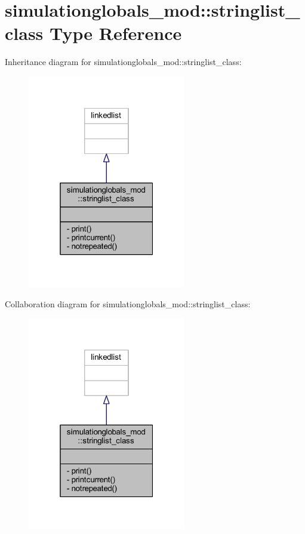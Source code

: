 \hypertarget{structsimulationglobals__mod_1_1stringlist__class}{}\section{simulationglobals\+\_\+mod\+:\+:stringlist\+\_\+class Type Reference}
\label{structsimulationglobals__mod_1_1stringlist__class}


Inheritance diagram for simulationglobals\+\_\+mod\+:\+:stringlist\+\_\+class\+:\nopagebreak
\begin{figure}[H]
\begin{center}
\leavevmode
\includegraphics[width=196pt]{structsimulationglobals__mod_1_1stringlist__class__inherit__graph}
\end{center}
\end{figure}


Collaboration diagram for simulationglobals\+\_\+mod\+:\+:stringlist\+\_\+class\+:\nopagebreak
\begin{figure}[H]
\begin{center}
\leavevmode
\includegraphics[width=196pt]{structsimulationglobals__mod_1_1stringlist__class__coll__graph}
\end{center}
\end{figure}
